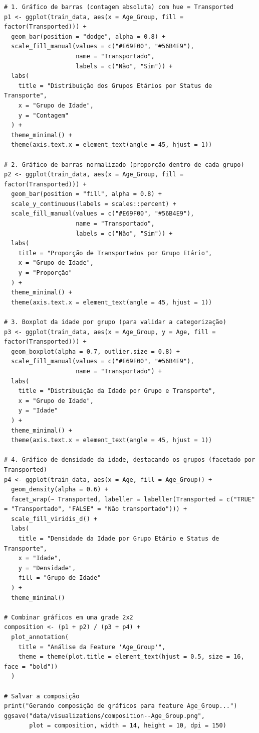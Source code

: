 \documentclass[12pt,a4paper]{article}
\begin{document}
\begin{verbatim}
# 1. Gráfico de barras (contagem absoluta) com hue = Transported
p1 <- ggplot(train_data, aes(x = Age_Group, fill = factor(Transported))) +
  geom_bar(position = "dodge", alpha = 0.8) +
  scale_fill_manual(values = c("#E69F00", "#56B4E9"), 
                    name = "Transportado",
                    labels = c("Não", "Sim")) +
  labs(
    title = "Distribuição dos Grupos Etários por Status de Transporte",
    x = "Grupo de Idade",
    y = "Contagem"
  ) +
  theme_minimal() +
  theme(axis.text.x = element_text(angle = 45, hjust = 1))

# 2. Gráfico de barras normalizado (proporção dentro de cada grupo)
p2 <- ggplot(train_data, aes(x = Age_Group, fill = factor(Transported))) +
  geom_bar(position = "fill", alpha = 0.8) +
  scale_y_continuous(labels = scales::percent) +
  scale_fill_manual(values = c("#E69F00", "#56B4E9"), 
                    name = "Transportado",
                    labels = c("Não", "Sim")) +
  labs(
    title = "Proporção de Transportados por Grupo Etário",
    x = "Grupo de Idade",
    y = "Proporção"
  ) +
  theme_minimal() +
  theme(axis.text.x = element_text(angle = 45, hjust = 1))

# 3. Boxplot da idade por grupo (para validar a categorização)
p3 <- ggplot(train_data, aes(x = Age_Group, y = Age, fill = factor(Transported))) +
  geom_boxplot(alpha = 0.7, outlier.size = 0.8) +
  scale_fill_manual(values = c("#E69F00", "#56B4E9"), 
                    name = "Transportado") +
  labs(
    title = "Distribuição da Idade por Grupo e Transporte",
    x = "Grupo de Idade",
    y = "Idade"
  ) +
  theme_minimal() +
  theme(axis.text.x = element_text(angle = 45, hjust = 1))

# 4. Gráfico de densidade da idade, destacando os grupos (facetado por Transported)
p4 <- ggplot(train_data, aes(x = Age, fill = Age_Group)) +
  geom_density(alpha = 0.6) +
  facet_wrap(~ Transported, labeller = labeller(Transported = c("TRUE" = "Transportado", "FALSE" = "Não transportado"))) +
  scale_fill_viridis_d() +
  labs(
    title = "Densidade da Idade por Grupo Etário e Status de Transporte",
    x = "Idade",
    y = "Densidade",
    fill = "Grupo de Idade"
  ) +
  theme_minimal()

# Combinar gráficos em uma grade 2x2
composition <- (p1 + p2) / (p3 + p4) +
  plot_annotation(
    title = "Análise da Feature 'Age_Group'",
    theme = theme(plot.title = element_text(hjust = 0.5, size = 16, face = "bold"))
  )

# Salvar a composição
print("Gerando composição de gráficos para feature Age_Group...")
ggsave("data/visualizations/composition--Age_Group.png", 
       plot = composition, width = 14, height = 10, dpi = 150)
\end{verbatim}
\end{document}

